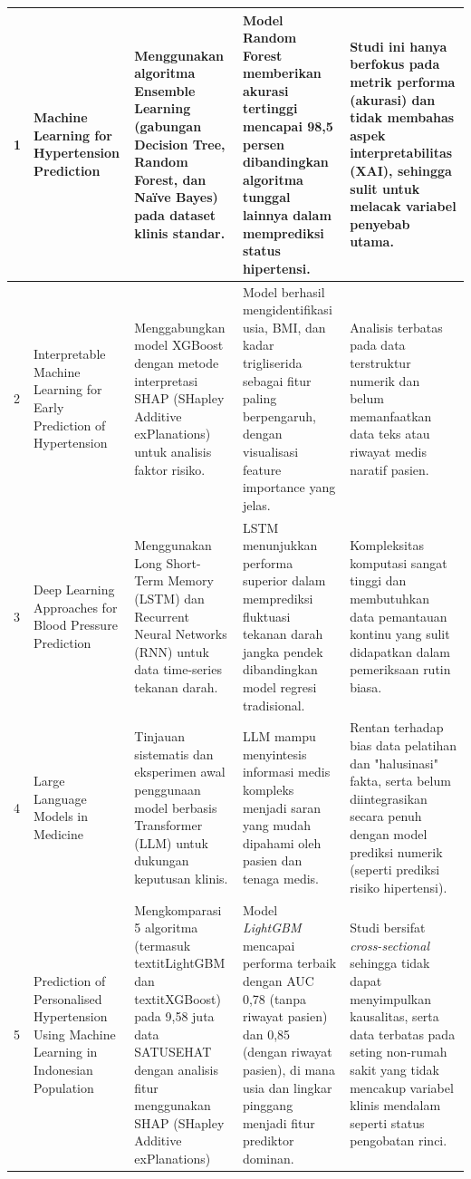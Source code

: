 \begin{longtable}{@{\extracolsep{\fill}} p{0.5cm} p{3.5cm} p{3.5cm} p{3.5cm} p{3.5cm}}
1 & Machine Learning for Hypertension Prediction \parencite{ElSalamony2023Machine} & 
Menggunakan algoritma Ensemble Learning (gabungan Decision Tree, Random Forest, dan Naïve Bayes) pada dataset klinis standar. & 
Model Random Forest memberikan akurasi tertinggi mencapai 98,5 persen dibandingkan algoritma tunggal lainnya dalam memprediksi status hipertensi. & 
Studi ini hanya berfokus pada metrik performa (akurasi) dan tidak membahas aspek interpretabilitas (XAI), sehingga sulit untuk melacak variabel penyebab utama. \\
\hline
2 & Interpretable Machine Learning for Early Prediction of Hypertension \parencite{Miao2022Risk} & 
Menggabungkan model XGBoost dengan metode interpretasi SHAP (SHapley Additive exPlanations) untuk analisis faktor risiko. & 
Model berhasil mengidentifikasi usia, BMI, dan kadar trigliserida sebagai fitur paling berpengaruh, dengan visualisasi feature importance yang jelas. & 
Analisis terbatas pada data terstruktur numerik dan belum memanfaatkan data teks atau riwayat medis naratif pasien. \\
\hline
3 & Deep Learning Approaches for Blood Pressure Prediction \parencite{Cheng2021Blood} & 
Menggunakan Long Short-Term Memory (LSTM) dan Recurrent Neural Networks (RNN) untuk data time-series tekanan darah. & 
LSTM menunjukkan performa superior dalam memprediksi fluktuasi tekanan darah jangka pendek dibandingkan model regresi tradisional. & 
Kompleksitas komputasi sangat tinggi dan membutuhkan data pemantauan kontinu yang sulit didapatkan dalam pemeriksaan rutin biasa. \\
\hline
4 & Large Language Models in Medicine \parencite{Thirunavukarasu2023Large} \parencite{Thirunavukarasu2023Large} & 
Tinjauan sistematis dan eksperimen awal penggunaan model berbasis Transformer (LLM) untuk dukungan keputusan klinis. & 
LLM mampu menyintesis informasi medis kompleks menjadi saran yang mudah dipahami oleh pasien dan tenaga medis. & 
Rentan terhadap bias data pelatihan dan "halusinasi" fakta, serta belum diintegrasikan secara penuh dengan model prediksi numerik (seperti prediksi risiko hipertensi). \\
\hline
5 & Prediction of Personalised Hypertension Using Machine Learning in Indonesian Population \parencite{Septian2025Prediction} \parencite{Septian2025Prediction} & 
Mengkomparasi 5 algoritma (termasuk textit{LightGBM} dan textit{XGBoost}) pada 9,58 juta data SATUSEHAT dengan analisis fitur menggunakan SHAP (SHapley Additive exPlanations) & 
Model \textit{LightGBM} mencapai performa terbaik dengan AUC 0,78 (tanpa riwayat pasien) dan 0,85 (dengan riwayat pasien), di mana usia dan lingkar pinggang menjadi fitur prediktor dominan. & 
Studi bersifat \textit{cross-sectional} sehingga tidak dapat menyimpulkan kausalitas, serta data terbatas pada seting non-rumah sakit yang tidak mencakup variabel klinis mendalam seperti status pengobatan rinci. \\
\end{longtable}